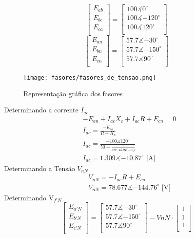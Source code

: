 \documentclass[a4paper, 12pt]{article}
\begin{document}
			\[\begin{bmatrix}
				E_{ab} \\
				E_{bc} \\
				E_{ca} \\
			\end{bmatrix}
			=
			\begin{bmatrix}
				100\measuredangle{0^\circ} \\
				100\measuredangle{-120^\circ} \\
				100\measuredangle{120^\circ} \\
			\end{bmatrix}
			\]
			\[\begin{bmatrix}
				E_{an} \\
				E_{bn} \\
				E_{cn} \\
			\end{bmatrix}
			=
			\begin{bmatrix}
				57.7\measuredangle{-30^\circ} \\
				57.7\measuredangle{-150^\circ} \\
				57.7\measuredangle{90^\circ} \\
			\end{bmatrix}
			\]
			\begin{figure}[H]
				\centering %
				\texttt{[image: fasores/fasores\_de\_tensao.png]}
				\caption{Representação gráfica dos fasores }
			\end{figure}
			Determinando a corrente $I_{ac}$
			\[ \begin{split}
				&- E_{an} + I_{ac}X_c + I_{ac}R + E_{cn} = 0 \\
				&I_{ac} = \frac{-E_{ca}}{R+X_c}\\
				&I_{ac} = \frac{-100\measuredangle{ 120^\circ} }{50+\frac{1}{377\cdot 45.9E-6j}} \\
				&I_{ac} = 1.309 \measuredangle{-10.87^\circ} \text{ [A]}
			\end{split}
			\]
			Determinando a Tensão $V_{nN}$
			\[ \begin{split}
				&V_{nN} = - I_{ac}R + E_{cn}  \\
				&V_{nN} = 78.677 \measuredangle{-144.76^\circ} \text{ [V]}
			\end{split}
			\]
			Determinando V$_{f'N}$
			\[\begin{bmatrix}
				E_{a'N} \\
				E_{b'N} \\
				E_{c'N} \\
			\end{bmatrix}
			=
			\begin{bmatrix}
				57.7\measuredangle{-30^\circ} \\
				57.7\measuredangle{-150^\circ} \\
				57.7\measuredangle{90^\circ} \\
			\end{bmatrix}
			-VnN \cdot \begin{bmatrix}
				1\\
				1\\
				1\\
			\end{bmatrix}
			\]
\end{document}
